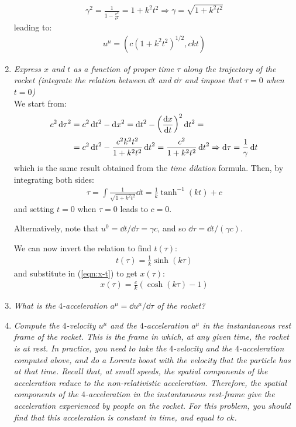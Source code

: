 \documentclass[../template.tex]{subfiles}
\begin{document}
\begin{enumerate}
\begin{align*}
        \gamma^2 = \frac{1}{1-\frac{v^2}{c^2} }  = 1 + k^2 t^2 \Rightarrow \gamma = \sqrt{1+k^2 t^2}
    \end{align*} 
    leading to:
    \begin{align*}
        u^\mu = (c(1+k^2t^2)^{1/2}, ckt)
    \end{align*}
    \item \textit{Express $x$ and $t$ as a function of proper time $\tau$ along the trajectory of the rocket (integrate the relation between $\dd{t}$ and $\dd{\tau}$ and impose that $\tau = 0$ when $t=0$)}\\
    We start from:
    \begin{align*}
        c^2 \dd{\tau}^2 &= c^2 \dd{t}^2 - \dd{x}^2 = \dd{t}^2 - \left(\dv{x}{t}\right)^2 \dd{t}^2 =\\
        &= c^2 \dd{t}^2 - \frac{c^2 k^2 t^2}{1+k^2 t^2} \dd{t}^2 = \frac{c^2}{1+k^2 t^2} \dd{t}^2 \Rightarrow \dd{\tau} = \frac{1}{\gamma}\dd{t}   
    \end{align*} 
    which is the same result obtained from the \textit{time dilation} formula. Then, by integrating both sides:
    \begin{align*}
        \tau = \int \frac{1}{\sqrt{1+k^2 t^2}}\dd{t} = \frac{1}{k} \tanh^{-1}(kt) + c  
    \end{align*} 
    and setting $t=0$ when $\tau = 0$ leads to $c = 0$.
    \begin{expl}
        Alternatively, note that $u^0 = \dd{t}/\dd{\tau} = \gamma c$, and so $\dd{\tau} = \dd{t}/(\gamma c)$.  
    \end{expl}
    We can now invert the relation to find $t(\tau)$:
    \begin{align*}
        t(\tau) = \frac{1}{k} \sinh(k \tau) 
    \end{align*}
    and substitute in (\ref{eqn:x-t}) to get $x(\tau)$:
    \begin{align*}
        x(\tau) = \frac{c}{k}(\cosh(k \tau)-1) 
    \end{align*} 
    \item \textit{What is the $4$-acceleration $a^\mu = \dd{u^\mu}/\dd{\tau}$ of the rocket?}
    \item \textit{Compute the $4$-velocity $u^\mu$ and the $4$-acceleration $a^\mu$ in the instantaneous rest frame of the rocket. This is the frame in which, at any given time, the rocket is at rest. In practice, you need to take the $4$-velocity and the $4$-acceleration computed above, and do a Lorentz boost with the velocity that the particle has at that time. Recall that, at small speeds, the spatial components of the acceleration reduce to the non-relativistic acceleration. Therefore, the spatial components of the $4$-acceleration in the instantaneous rest-frame give the acceleration experienced by people on the rocket. For this problem, you should find that this acceleration is constant in time, and equal to $ck$.}\\  

\end{enumerate}
\end{document}
